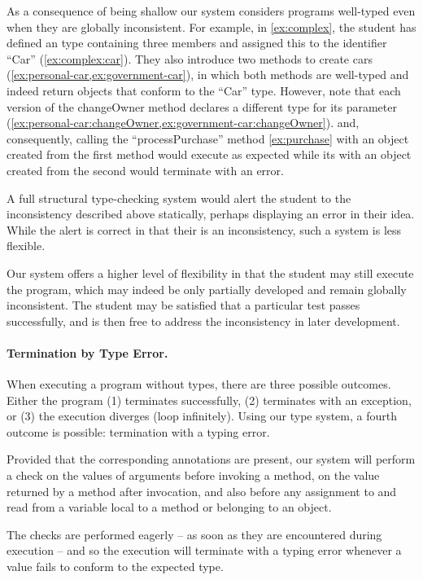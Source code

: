As a consequence of being shallow our system considers programs
well-typed even when they are globally inconsistent.
For example, in \cref{ex:complex}, the student has defined an type containing
three members and assigned this to the identifier ``Car'' (\cref{ex:complex:car}).
They also introduce two methods to create cars 
(\cref{ex:personal-car,ex:government-car}),
in which both methods are well-typed and indeed return objects that conform to
the ``Car'' type.
However, note that each version of the changeOwner method
declares a different type for its parameter
(\cref{ex:personal-car:changeOwner,ex:government-car:changeOwner}).
and, consequently, calling the 
``processPurchase'' method \cref{ex:purchase} with
an object created from the first method would execute as expected
while its with an object created from the second would terminate with
an error. 

A full structural type-checking system would alert the student to 
the inconsistency described above statically,
perhaps displaying an error in their idea. 
While the alert is correct in that their is an inconsistency,
such a system is less flexible. 

Our system offers a higher level of flexibility in that the student
may still execute the program, 
which may indeed be only partially developed and remain globally inconsistent.
The student may be satisfied that a particular test passes successfully, and
is then free to address the inconsistency in later development.


\paragraph{Termination by Type Error.}

When executing a program without types, there are three possible outcomes.
Either the program (1) terminates successfully,
(2) terminates with an exception, or 
(3) the execution diverges (loop infinitely). Using our type system, a
fourth outcome is possible: termination with a typing error.

Provided that the corresponding annotations are present, 
our system will perform a check
on the values of arguments before invoking a method, 
on the value returned by a method after invocation, and
also before any assignment to and read from a variable local to
a method or belonging to an object. 

The checks are performed eagerly
-- as soon as they are encountered during execution --
and so the execution will terminate with a typing error 
whenever a value fails to conform to the expected type.

